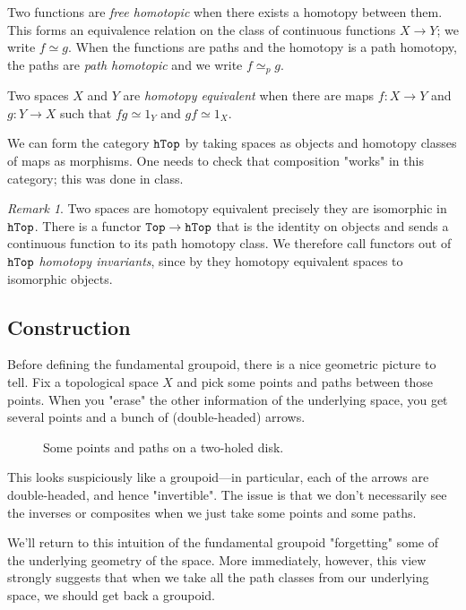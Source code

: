 \documentclass[11 pt]{amsart}
\theoremstyle{plain}   %
\theoremstyle{definition}
\theoremstyle{remark}
\newtheorem{rem}{Remark}[section]
\numberwithin{equation}{section}
\newcommand{\cat}[1]{{\normalfont\texttt{#1}}}
\begin{document}
Two functions are \emph{free homotopic} when there exists a homotopy between
them. This forms an equivalence relation on the class of continuous functions
$X\rightarrow Y$; we write $f\simeq g$. When the functions are paths and the
homotopy is a path homotopy, the paths are \emph{path homotopic} and we write
$f\simeq_p g$.

Two spaces $X$ and $Y$ are \emph{homotopy equivalent} when there are maps $f:
	X\rightarrow Y$ and $g: Y\rightarrow X$ such that $fg\simeq 1_Y$ and $gf\simeq
	1_X$.

We can form the category $\cat{hTop}$ by taking spaces as objects and homotopy
classes of maps as morphisms. One needs to check that composition "works" in
this category; this was done in class.

\begin{rem} Two spaces are homotopy equivalent precisely they are isomorphic in
	$\cat{hTop}$. There is a functor $\cat{Top}\rightarrow\cat{hTop}$ that is the
	identity on objects and sends a continuous function to its path homotopy
	class. We therefore call functors out of $\cat{hTop}$ \emph{homotopy
		invariants}, since by  they homotopy
	equivalent spaces to isomorphic objects. \end{rem}

\subsection{Construction}

Before defining the fundamental groupoid, there is a nice geometric picture to
tell. Fix a topological space $X$ and pick some points and paths between those
points. When you "erase" the other information of the underlying
space, you get several points and a bunch of (double-headed) arrows.

\begin{figure}[H]
	\centering
	
	\caption{Some points and paths on a two-holed disk.}
	\label{fig:group}
\end{figure}

This looks suspiciously like a groupoid---in particular, each of the arrows are
double-headed, and hence "invertible". The issue is that we don't necessarily
see the inverses or composites when we just take some points and some paths.

We'll return to this intuition of the fundamental groupoid "forgetting" some of
the underlying geometry of the space. More immediately, however, this view
strongly suggests that when we take all the path classes from our underlying space,
we should get back a groupoid.
\end{document}

